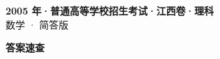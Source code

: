 \documentclass[zihao=-4, a4paper]{ctexart}
\begin{document}
\begin{center}
  {\Large\bfseries 2005 年·普通高等学校招生考试·江西卷·理科}\\[4pt]
  {\large 数学 · 简答版}
\end{center}
\medskip
{}

\clearpage
{}
\begin{center}{\Large\bfseries 答案速查}\end{center}
\medskip

\end{document}
